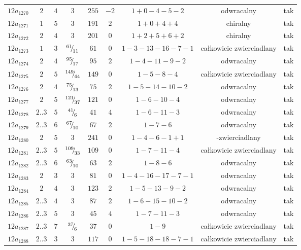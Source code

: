 \begin{longtable}{ccccccccc}
$12a_{1270}$ & $2$ & $4$ & $3$ & $255$ & $-2$ & $1+0-4-5-2$ & odwracalny & tak \\
$12a_{1271}$ & $1$ & $5$ & $3$ & $191$ & $2$ & $1+0+4+4$ & chiralny & tak \\
$12a_{1272}$ & $2$ & $4$ & $3$ & $201$ & $0$ & $1+2+5+6+2$ & chiralny & tak \\
$12a_{1273}$ & $1$ & $3$ & ${}^{61}{\mskip -5mu/\mskip -3mu}_{11}$ & $61$ & $0$ & $1-3-13-16-7-1$ & całkowicie zwierciadlany & tak \\
$12a_{1274}$ & $2$ & $4$ & ${}^{95}{\mskip -5mu/\mskip -3mu}_{17}$ & $95$ & $2$ & $1-4-11-9-2$ & odwracalny & tak \\
$12a_{1275}$ & $2$ & $5$ & ${}^{149}{\mskip -5mu/\mskip -3mu}_{44}$ & $149$ & $0$ & $1-5-8-4$ & całkowicie zwierciadlany & tak \\
$12a_{1276}$ & $2$ & $4$ & ${}^{75}{\mskip -5mu/\mskip -3mu}_{13}$ & $75$ & $2$ & $1-5-14-10-2$ & odwracalny & tak \\
$12a_{1277}$ & $2$ & $5$ & ${}^{121}{\mskip -5mu/\mskip -3mu}_{37}$ & $121$ & $0$ & $1-6-10-4$ & odwracalny & tak \\
$12a_{1278}$ & $2..3$ & $5$ & ${}^{41}{\mskip -5mu/\mskip -3mu}_{6}$ & $41$ & $4$ & $1-6-11-3$ & odwracalny & tak \\
$12a_{1279}$ & $2..3$ & $6$ & ${}^{67}{\mskip -5mu/\mskip -3mu}_{10}$ & $67$ & $2$ & $1-7-6$ & odwracalny & tak \\
$12a_{1280}$ & $2$ & $5$ & $3$ & $241$ & $0$ & $1-4-6-1+1$ & -zwierciadlany & tak \\
$12a_{1281}$ & $2..3$ & $5$ & ${}^{109}{\mskip -5mu/\mskip -3mu}_{33}$ & $109$ & $0$ & $1-7-11-4$ & całkowicie zwierciadlany & tak \\
$12a_{1282}$ & $2..3$ & $6$ & ${}^{63}{\mskip -5mu/\mskip -3mu}_{10}$ & $63$ & $2$ & $1-8-6$ & odwracalny & tak \\
$12a_{1283}$ & $2$ & $3$ & $3$ & $81$ & $0$ & $1-4-16-17-7-1$ & odwracalny & tak \\
$12a_{1284}$ & $2$ & $4$ & $3$ & $123$ & $2$ & $1-5-13-9-2$ & odwracalny & tak \\
$12a_{1285}$ & $2..3$ & $4$ & $3$ & $87$ & $2$ & $1-6-15-10-2$ & odwracalny & tak \\
$12a_{1286}$ & $2..3$ & $5$ & $3$ & $45$ & $4$ & $1-7-11-3$ & odwracalny & tak \\
$12a_{1287}$ & $2..3$ & $7$ & ${}^{37}{\mskip -5mu/\mskip -3mu}_{6}$ & $37$ & $0$ & $1-9$ & całkowicie zwierciadlany & tak \\
$12a_{1288}$ & $2..3$ & $3$ & $3$ & $117$ & $0$ & $1-5-18-18-7-1$ & całkowicie zwierciadlany & tak \\

\end{longtable}
